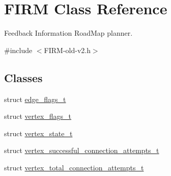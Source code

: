 \hypertarget{class_f_i_r_m}{\section{\-F\-I\-R\-M \-Class \-Reference}
\label{class_f_i_r_m}
}


\-Feedback \-Information \-Road\-Map planner.  




{\ttfamily \#include $<$\-F\-I\-R\-M-\/old-\/v2.\-h$>$}

\subsection*{\-Classes}
\begin{DoxyCompactItemize}
\item 
struct \hyperlink{struct_f_i_r_m_1_1edge__flags__t}{edge\-\_\-flags\-\_\-t}
\item 
struct \hyperlink{struct_f_i_r_m_1_1vertex__flags__t}{vertex\-\_\-flags\-\_\-t}
\item 
struct \hyperlink{struct_f_i_r_m_1_1vertex__state__t}{vertex\-\_\-state\-\_\-t}
\item 
struct \hyperlink{struct_f_i_r_m_1_1vertex__successful__connection__attempts__t}{vertex\-\_\-successful\-\_\-connection\-\_\-attempts\-\_\-t}
\item 
struct \hyperlink{struct_f_i_r_m_1_1vertex__total__connection__attempts__t}{vertex\-\_\-total\-\_\-connection\-\_\-attempts\-\_\-t}
\end{DoxyCompactItemize}
